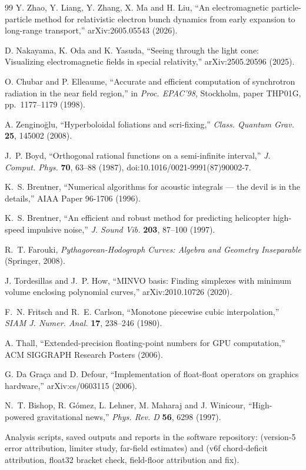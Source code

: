 \documentclass[11pt, a4paper]{article}
\begin{document}
{\begin{thebibliography}{99}
Y. Zhao, Y. Liang, Y. Zhang, X. Ma and H. Liu, ``An electromagnetic particle-particle method for relativistic electron bunch dynamics from early expansion to long-range transport,'' arXiv:2605.05543 (2026).

D. Nakayama, K. Oda and K. Yasuda, ``Seeing through the light cone: Visualizing electromagnetic fields in special relativity,'' arXiv:2505.20596 (2025).

O. Chubar and P. Elleaume, ``Accurate and efficient computation of synchrotron radiation in the near field region,'' in \textit{Proc. EPAC'98}, Stockholm, paper THP01G, pp.~1177--1179 (1998).

A. Zengino\u{g}lu, ``Hyperboloidal foliations and scri-fixing,'' \textit{Class. Quantum Grav.} \textbf{25}, 145002 (2008).

J.~P. Boyd, ``Orthogonal rational functions on a semi-infinite interval,'' \textit{J. Comput. Phys.} \textbf{70}, 63--88 (1987), doi:10.1016/0021-9991(87)90002-7.

K.~S. Brentner, ``Numerical algorithms for acoustic integrals --- the devil is in the details,'' AIAA Paper 96-1706 (1996).

K.~S. Brentner, ``An efficient and robust method for predicting helicopter high-speed impulsive noise,'' \textit{J. Sound Vib.} \textbf{203}, 87--100 (1997).

R.~T. Farouki, \textit{Pythagorean-Hodograph Curves: Algebra and Geometry Inseparable} (Springer, 2008).

J. Tordesillas and J.~P. How, ``MINVO basis: Finding simplexes with minimum volume enclosing polynomial curves,'' arXiv:2010.10726 (2020).

F.~N. Fritsch and R.~E. Carlson, ``Monotone piecewise cubic interpolation,'' \textit{SIAM J. Numer. Anal.} \textbf{17}, 238--246 (1980).

A. Thall, ``Extended-precision floating-point numbers for GPU computation,'' ACM SIGGRAPH Research Posters (2006).

G. Da Gra\c{c}a and D. Defour, ``Implementation of float-float operators on graphics hardware,'' arXiv:cs/0603115 (2006).

N.~T. Bishop, R. G\'omez, L. Lehner, M. Maharaj and J. Winicour, ``High-powered gravitational news,'' \textit{Phys. Rev. D} \textbf{56}, 6298 (1997).

Analysis scripts, saved outputs and reports in the software repository:  (version-5 error attribution, limiter study, far-field estimates) and  (v6f chord-deficit attribution, float32 bracket check, field-floor attribution and fix).

\end{thebibliography}
}
\end{document}

